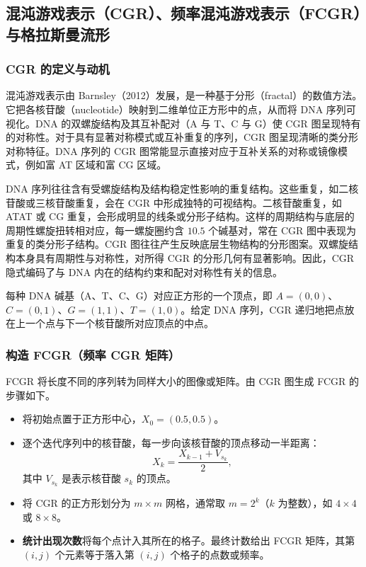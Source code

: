 \subsection{混沌游戏表示（CGR）、频率混沌游戏表示（FCGR）与格拉斯曼流形}
\subsubsection{CGR 的定义与动机}
混沌游戏表示由 Barnsley（2012）发展，是一种基于分形（fractal）的数值方法。它把各核苷酸（nucleotide）映射到二维单位正方形中的点，从而将 DNA 序列可视化。DNA 的双螺旋结构及其互补配对（A 与 T、C 与 G）使 CGR 图呈现特有的对称性。对于具有显著对称模式或互补重复的序列，CGR 图呈现清晰的类分形对称特征。DNA 序列的 CGR 图常能显示直接对应于互补关系的对称或镜像模式，例如富 AT 区域和富 CG 区域。

DNA 序列往往含有受螺旋结构及结构稳定性影响的重复结构。这些重复，如二核苷酸或三核苷酸重复，会在 CGR 中形成独特的可视结构。二核苷酸重复，如 ATAT 或 CG 重复，会形成明显的线条或分形子结构。这样的周期结构与底层的周期性螺旋扭转相对应，每一螺旋圈约含 $10.5$ 个碱基对，常在 CGR 图中表现为重复的类分形子结构。CGR 图往往产生反映底层生物结构的分形图案。双螺旋结构本身具有周期性与对称性，对所得 CGR 的分形几何有显著影响。因此，CGR 隐式编码了与 DNA 内在的结构约束和配对对称性有关的信息。

每种 DNA 碱基（A、T、C、G）对应正方形的一个顶点，即 $A=(0,0)$、$C=(0,1)$、$G=(1,1)$、$T=(1,0)$。给定 DNA 序列，CGR 递归地把点放在上一个点与下一个核苷酸所对应顶点的中点。

\subsubsection{构造 FCGR（频率 CGR 矩阵）}
FCGR 将长度不同的序列转为同样大小的图像或矩阵。由 CGR 图生成 FCGR 的步骤如下。
\begin{itemize}
  \item 将初始点置于正方形中心，$X_0=(0.5,0.5)$。
  \item 逐个迭代序列中的核苷酸，每一步向该核苷酸的顶点移动一半距离：
  \[
    X_k=\frac{X_{k-1}+V_{s_k}}{2},
  \]
  其中 $V_{s_k}$ 是表示核苷酸 $s_k$ 的顶点。
  \item 将 CGR 的正方形划分为 $m\times m$ 网格，通常取 $m=2^k$（$k$ 为整数），如 $4\times4$ 或 $8\times8$。
  \item \textbf{统计出现次数}\quad 将每个点计入其所在的格子。最终计数给出 FCGR 矩阵，其第 $(i,j)$ 个元素等于落入第 $(i,j)$ 个格子的点数或频率。
\end{itemize}

